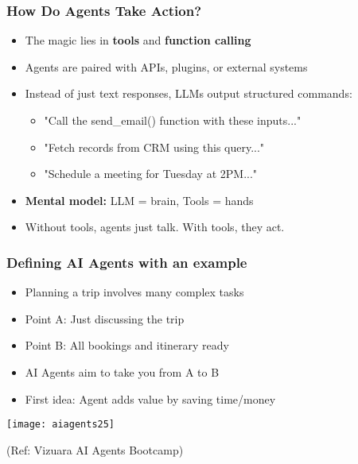 \begin{frame}[fragile]\frametitle{How Do Agents Take Action?}
\begin{itemize}
    \item The magic lies in \textbf{tools} and \textbf{function calling}
    \item Agents are paired with APIs, plugins, or external systems
    \item Instead of just text responses, LLMs output structured commands:
    \begin{itemize}
        \item "Call the send\_email() function with these inputs..."
        \item "Fetch records from CRM using this query..."
        \item "Schedule a meeting for Tuesday at 2PM..."
    \end{itemize}
    \item \textbf{Mental model:} LLM = brain, Tools = hands
    \item Without tools, agents just talk. With tools, they act.
\end{itemize}
\end{frame}


\begin{frame}[fragile]\frametitle{Defining AI Agents with an example}

      \begin{itemize}
		\item Planning a trip involves many complex tasks
		\item Point A: Just discussing the trip
		\item Point B: All bookings and itinerary ready
		\item AI Agents aim to take you from A to B
		\item First idea: Agent adds value by saving time/money
      \end{itemize}

		\begin{center}
		\texttt{[image: aiagents25]}
		
		{\tiny (Ref: Vizuara AI Agents Bootcamp)}
		\end{center}	

\end{frame}

